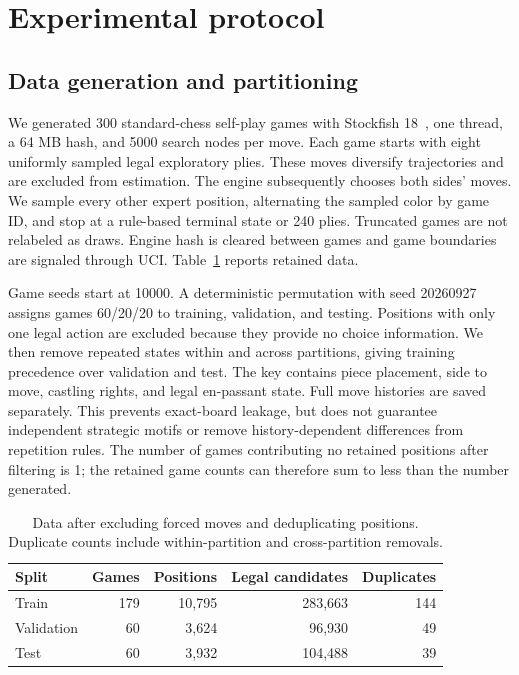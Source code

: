 \documentclass[11pt]{article}
\begin{document}
\section{Experimental protocol}
\subsection{Data generation and partitioning}
We generated 300 standard-chess self-play games with Stockfish 18\ \cite{stockfish}, one thread, a 64 MB hash, and 5000 search nodes per move. Each game starts with eight uniformly sampled legal exploratory plies. These moves diversify trajectories and are excluded from estimation. The engine subsequently chooses both sides' moves. We sample every other expert position, alternating the sampled color by game ID, and stop at a rule-based terminal state or 240 plies. Truncated games are not relabeled as draws. Engine hash is cleared between games and game boundaries are signaled through UCI. Table~\ref{tab:data} reports retained data.

Game seeds start at 10000. A deterministic permutation with seed 20260927 assigns games 60/20/20 to training, validation, and testing. Positions with only one legal action are excluded because they provide no choice information. We then remove repeated states within and across partitions, giving training precedence over validation and test. The key contains piece placement, side to move, castling rights, and legal en-passant state. Full move histories are saved separately. This prevents exact-board leakage, but does not guarantee independent strategic motifs or remove history-dependent differences from repetition rules. The number of games contributing no retained positions after filtering is 1; the retained game counts can therefore sum to less than the number generated.

\begin{table}[ht]
\centering
\caption{Data after excluding forced moves and deduplicating positions. Duplicate counts include within-partition and cross-partition removals.}\label{tab:data}
\begin{tabular}{lrrrr}\toprule
Split & Games & Positions & Legal candidates & Duplicates\\\midrule
Train & 179 & 10,795 & 283,663 & 144\\
Validation & 60 & 3,624 & 96,930 & 49\\
Test & 60 & 3,932 & 104,488 & 39\\
\bottomrule\end{tabular}
\end{table}
\end{document}
